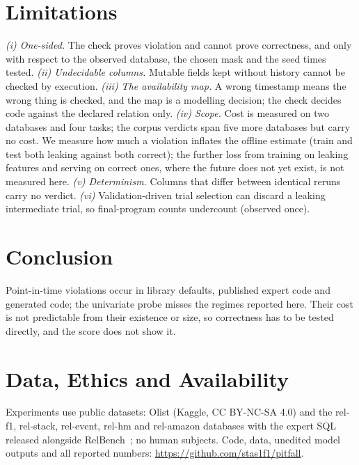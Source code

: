 \documentclass[conference]{IEEEtran}
\begin{document}
\section{Limitations}

\emph{(i) One-sided.} The check proves violation and cannot prove correctness, and only
with respect to the observed database, the chosen mask and the seed times tested. \emph{(ii) Undecidable columns.} Mutable fields
kept without history cannot be checked by execution. \emph{(iii) The availability map.} A
wrong timestamp means the wrong thing is checked, and the map is a modelling decision;
the check decides code against the declared relation only. \emph{(iv) Scope.} Cost is measured on
two databases and four tasks; the corpus verdicts span five more databases but carry no
cost. We measure how much a violation inflates the offline estimate (train and test both
leaking against both correct); the further loss from training on leaking features and
serving on correct ones, where the future does not yet exist, is not measured here. \emph{(v) Determinism.} Columns that differ between identical
reruns carry no verdict. \emph{(vi)} Validation-driven trial selection can discard a leaking intermediate
trial, so final-program counts undercount (observed once).

\section{Conclusion}

Point-in-time violations occur in library defaults, published expert code and generated
code; the univariate probe misses the regimes reported here. Their cost is not predictable from their existence or size, so correctness has to
be tested directly, and the score does not show it.

\section*{Data, Ethics and Availability}
Experiments use public datasets: Olist (Kaggle, CC BY-NC-SA 4.0) and the \mbox{rel-f1}, \mbox{rel-stack}, \mbox{rel-event}, \mbox{rel-hm} and
\mbox{rel-amazon} databases with the expert SQL released alongside
RelBench~\cite{relbench}; no human subjects. Code, data, unedited model outputs and all
reported numbers:
\url{https://github.com/stas1f1/pitfall}.

{\let\footnotesize\scriptsize

}
\end{document}
